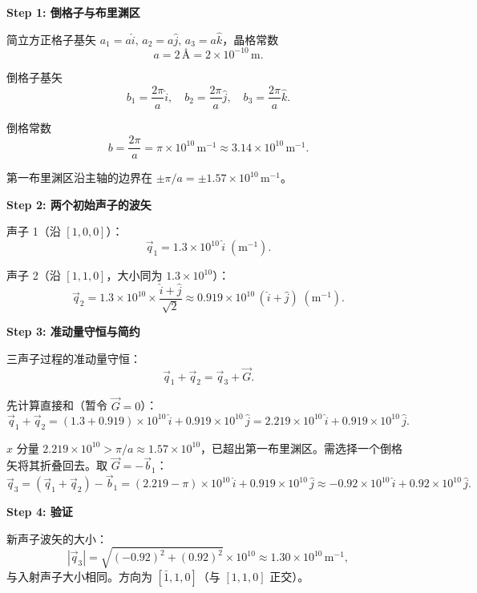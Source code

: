 \begin{derivationbox}[标准解题过程]
\textbf{Step 1: 倒格子与布里渊区}

简立方正格子基矢 $a_1=a\hat i,\,a_2=a\hat j,\,a_3=a\hat k$，晶格常数
\begin{equation}
a = 2\,\text{\AA} = 2\times10^{-10}\,\mathrm{m}.
\end{equation}

倒格子基矢
\begin{equation}
b_1 = \frac{2\pi}{a}\hat i, \quad b_2 = \frac{2\pi}{a}\hat j, \quad b_3 = \frac{2\pi}{a}\hat k.
\end{equation}

倒格常数
\begin{equation}
b = \frac{2\pi}{a} = \pi\times10^{10}\,\mathrm{m^{-1}} \approx 3.14\times10^{10}\,\mathrm{m^{-1}}.
\end{equation}

第一布里渊区沿主轴的边界在 $\pm\pi/a = \pm1.57\times10^{10}\,\mathrm{m^{-1}}$。

\textbf{Step 2: 两个初始声子的波矢}

声子 1（沿 $[1,0,0]$）：
\begin{equation}
\vec q_1 = 1.3\times10^{10}\,\hat i\;(\mathrm{m^{-1}}).
\end{equation}

声子 2（沿 $[1,1,0]$，大小同为 $1.3\times10^{10}$）：
\begin{equation}
\vec q_2 = 1.3\times10^{10}\times\frac{\hat i+\hat j}{\sqrt2} \approx 0.919\times10^{10}\,(\hat i+\hat j)\;(\mathrm{m^{-1}}).
\end{equation}

\textbf{Step 3: 准动量守恒与简约}

三声子过程的准动量守恒：
\begin{equation}
\vec q_1 + \vec q_2 = \vec q_3 + \vec G.
\end{equation}

先计算直接和（暂令 $\vec G=0$）：
\begin{equation}
\vec q_1+\vec q_2 = (1.3+0.919)\times10^{10}\,\hat i + 0.919\times10^{10}\,\hat j = 2.219\times10^{10}\,\hat i + 0.919\times10^{10}\,\hat j.
\end{equation}

$x$ 分量 $2.219\times10^{10} > \pi/a\approx1.57\times10^{10}$，已超出第一布里渊区。需选择一个倒格矢将其折叠回去。取 $\vec G=-\vec b_1$：
\begin{equation}
\vec q_3 = (\vec q_1+\vec q_2) - \vec b_1 = (2.219-\pi)\times10^{10}\,\hat i + 0.919\times10^{10}\,\hat j \approx -0.92\times10^{10}\,\hat i + 0.92\times10^{10}\,\hat j.
\end{equation}

\textbf{Step 4: 验证}

新声子波矢的大小：
\begin{equation}
|\vec q_3| = \sqrt{(-0.92)^2+(0.92)^2}\times10^{10} \approx 1.30\times10^{10}\,\mathrm{m^{-1}},
\end{equation}
与入射声子大小相同。方向为 $[\bar1,1,0]$（与 $[1,1,0]$ 正交）。
\end{derivationbox}


